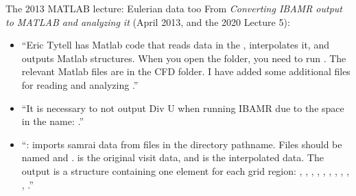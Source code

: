 \documentclass[aspectratio=169,11pt]{beamer}
\begin{document}
\begin{frame}{The 2013 MATLAB lecture: Eulerian data too}
\label{fr:tytell}
\small From \emph{Converting IBAMR output to MATLAB and analyzing it} (April 2013, and the 2020 Lecture 5):
\begin{itemize}
  \item ``Eric Tytell has Matlab code that reads data in the , interpolates it, and outputs Matlab structures. When you open the folder, you need to run . The relevant Matlab files are in the CFD folder. I have added some additional files for reading and analyzing .''
  \item ``It is necessary to not output Div U when running IBAMR due to the space in the name: .''
  \item ``: imports samrai data from files in the directory pathname. Files should be named  and .  is the original visit data, and  is the interpolated data. The output  is a structure containing one element for each grid region: , , , , , , , , , , .''
\end{itemize}
\end{frame}
\end{document}
